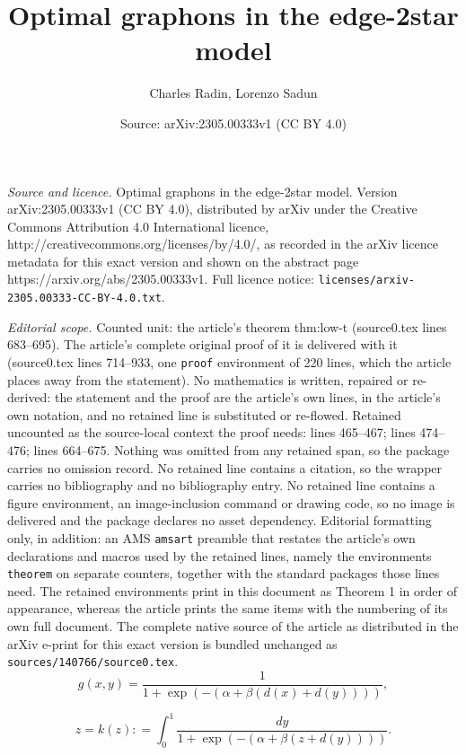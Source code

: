 \documentclass[10pt,a4paper]{amsart}
\title{Optimal graphons in the edge-2star model}
\author{Charles Radin, Lorenzo Sadun}
\date{Source: arXiv:2305.00333v1 (CC BY 4.0)}
\begin{document}
\maketitle

\noindent\emph{Source and licence.} Optimal graphons in the edge-2star model. Version arXiv:2305.00333v1 (CC BY 4.0), distributed by arXiv under the Creative Commons Attribution 4.0 International licence, http://creativecommons.org/licenses/by/4.0/, as recorded in the arXiv licence metadata for this exact version and shown on the abstract page https://arxiv.org/abs/2305.00333v1. Full licence notice: \texttt{licenses/arxiv-2305.00333-CC-BY-4.0.txt}.\par\smallskip

\noindent\textit{Editorial scope.} Counted unit: the article's theorem thm:low-t (source0.tex lines 683--695). The article's complete original proof of it is delivered with it (source0.tex lines 714--933, one \texttt{proof} environment of 220 lines, which the article places away from the statement). No mathematics is written, repaired or re-derived: the statement and the proof are the article's own lines, in the article's own notation, and no retained line is substituted or re-flowed.  Retained uncounted as the source-local context the proof needs: lines 465--467; lines 474--476; lines 664--675.  Nothing was omitted from any retained span, so the package carries no omission record.  No retained line contains a citation, so the wrapper carries no bibliography and no bibliography entry.  No retained line contains a figure environment, an image-inclusion command or drawing code, so no image is delivered and the package declares no asset dependency.  Editorial formatting only, in addition: an AMS \texttt{amsart} preamble that restates the article's own declarations and macros used by the retained lines, namely the environments \texttt{theorem} on separate counters, together with the standard packages those lines need.  The retained environments print in this document as Theorem 1 in order of appearance, whereas the article prints the same items with the numbering of its own full document.  The complete native source of the article as distributed in the arXiv e-print for this exact version is bundled unchanged as \texttt{sources/140766/source0.tex}.
\begin{equation}\label{eq1} 
g(x,y) = \frac{1}{1 + \exp(-(\alpha+\beta (d(x)+d(y))))},
\end{equation} 

\begin{equation}\label{eq3} 
z = k(z) : = \int_0^1 \frac{dy} {1 + \exp(-(\alpha+\beta (z+d(y))))}. 
\end{equation}
\end{document}
